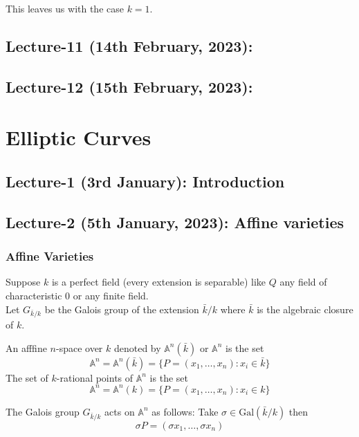 \documentclass[oneside, 12pt]{scrbook}
\newcommand{\Aa}{\mathbb{A}}
\theoremstyle{theorem}
\begin{document}
This leaves us with the case $k=1$.

\chapter{Lecture-11 (14th February, 2023): }


\chapter{Lecture-12 (15th February, 2023): }



\part{Elliptic Curves}

\chapter{Lecture-1 (3rd January): Introduction }

\chapter{Lecture-2 (5th January, 2023): Affine varieties }

\section{Affine Varieties}

Suppose $k$ is a perfect field (every extension is separable) like $Q$ any field of characteristic $0$ or any finite field. \\
Let $G_{\bar{k}/k}$ be the Galois group of the extension $\bar{k}/k$ where $\bar{k}$ is the algebraic closure of $k$.

\begin{definition}
An afffine $n$-space over $k$ denoted by $\Aa^n(\bar{k})$ or $\Aa^n$ is the set 
\begin{equation}
\Aa^n = \Aa^n(\bar{k}) = \{P=(x_{1}, \hdots , x_{n}): x_{i} \in \bar{k}\}
\end{equation}
The set of $k$-rational points of $\Aa^n$ is the set 
\begin{equation}
\Aa^n = \Aa^n(k) = \{P=(x_{1}, \hdots , x_{n}): x_{i} \in k\}
\end{equation}
\end{definition} 

The Galois group $G_{\bar{k}/k}$ acts on $\Aa^n$ as follows: Take $\sigma \in \mathrm{Gal}(\bar{k}/k)$ then 
\begin{equation}
\sigma P = (\sigma x_{1}, \hdots , \sigma x_{n})
\end{equation}
\end{document}
